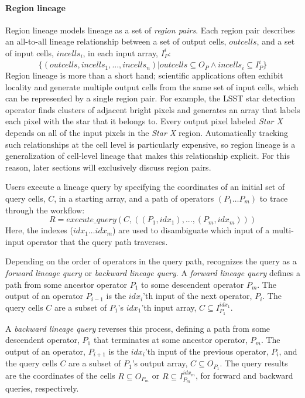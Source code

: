 \paragraph{Region lineage} Region lineage 
models lineage as a set of {\it region pairs}.  Each region pair describes an
all-to-all lineage relationship between a set of output cells, $outcells$, and
a set of input cells, $incells_i$, in each input array, $I_P^i$: 
{\footnotesize
    $$\{(outcells,incells_1,...,incells_n) | outcells \subseteq O_P
    \wedge incells_i \subseteq I_P^i\}$$ }
Region lineage is more than a short hand; scientific applications often exhibit
locality and generate multiple output cells from the same set of input cells,
which can be represented by a single region pair.  For example, the LSST star
detection operator finds clusters of adjacent bright pixels and generates an
array that labels each pixel with the star that it belongs to.  Every output
pixel labeled {\it Star X} depends on all of the input pixels in the {\it Star
X} region.  Automatically tracking such relationships at the cell level  is
particularly expensive, so region lineage is a generalization of cell-level
lineage that makes this relationship explicit.  For this reason, later sections
will exclusively discuss region pairs.





Users execute a lineage query by specifying the coordinates of
an initial set of query cells, $C$, in a starting array, and a path of
operators $(P_1 \ldots P_m)$  to trace through the workflow:
{\footnotesize
    $$R = execute\_query(C, ((P_1, idx_1),..., (P_m, idx_m)))$$
}
Here, the indexes ($idx_1 \ldots idx_m$) are used to disambiguate which input
of a multi-input operator that the query path traverses.  

Depending on the order of operators in the query path, \sys{} recognizes the
query as a {\it forward lineage query} or {\it backward lineage query}.  A {\it
forward lineage query} defines a path from some ancestor operator $P_1$ to some
descendent operator $P_m$.  The output of an operator $P_{i-1}$ is  the
$idx_i$'th input of the next operator, $P_i$.  The query cells $C$ are a
subset of $P_1$'s $idx_1$'th input array, $C \subseteq I_{P_1}^{idx_1}$.

A {\it backward lineage query} reverses this process, defining a path from some
descendent operator, $P_1$ that terminates at some ancestor operator, $P_m$.
The output of an operator, $P_{i+1}$ is the $idx_i$'th input of the previous
operator, $P_i$, and the query cells $C$ are a subset of $P_1$'s output array,
$C \subseteq O_{P_1}$.  
The query results are the coordinates of the cells $R \subseteq O_{P_m}$ or $R
\subseteq I_{P_m}^{idx_m}$, for forward and backward queries, respectively.











